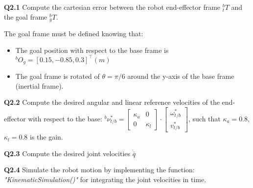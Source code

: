 \textbf{Q2.1} Compute the cartesian error between the robot end-effector frame $^b_t T$ and the goal frame $^b_{g} T$.

The goal frame  must be defined knowing that:
\begin{itemize}
    \item The goal position with respect to the base frame is $^b O_g = [0.15, -0.85, 0.3]^\top(m)$
    \item The goal frame is rotated of $\theta = \pi/6$ around the y-axis of the base frame (inertial frame).
\end{itemize}

\textbf{Q2.2}
Compute the desired angular and linear reference velocities of the end-effector  with respect to the base: $^b \nu^*_{t/b} = \begin{bmatrix}
    \kappa_a &0\\
    0 &\kappa_l
\end{bmatrix}\cdot \begin{bmatrix} \omega^*_{t/b} \\  v^*_{t/b} \end{bmatrix}$, such that $\kappa_{a} = 0.8$,$\kappa_{l} = 0.8$ is the gain.
    
\textbf{Q2.3}
Compute the desired joint velocities $\dot{\bar{q}}$

\textbf{Q2.4}
Simulate the robot motion by implementing the function: \textit{"KinematicSimulation()"} for integrating the joint velocities in time.